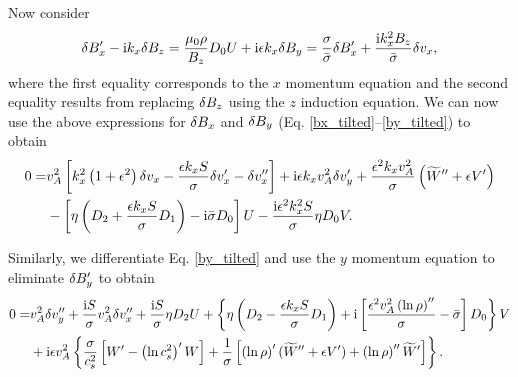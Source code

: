 Now consider
\begin{align}
  \delta B_x^\prime - \mathrm{i} k_x \delta B_z = \frac{\mu_0\rho}{B_z}D_0U +
  \mathrm{i}\epsilon k_x \delta B_y = \frac{\sigma}{\bar{\sigma}}\delta B_x^\prime +
  \frac{\mathrm{i} k_x^2B_z}{\bar{\sigma}}\delta v_x,
\end{align}
where the first equality corresponds to the $x$ momentum equation and
the second equality results from replacing $\delta B_z$ using the $z$
induction equation. We can now use the above expressions for $\delta B_x$
and $\delta B_y$ (Eq. \ref{bx_tilted}--\ref{by_tilted}) to obtain
\begin{align}
0 = &v_A^2\left[k_x^2\left(1+\epsilon^2\right)\dvx - \frac{\epsilon k_x
  S}{\sigma}\dvx^\prime - \dvx^{\prime\prime}\right] + \imgi\epsilon
k_x v_A^2 \dvy^\prime + \frac{\epsilon^2 k_x
  v_A^2}{\sigma}\left(\w^{\prime\prime} + \epsilon V^\prime\right) 
\notag\\ &-\left[\eta\left(D_2 + \frac{\epsilon k_x S}{\sigma}D_1\right) -
  \imgi\sbar D_0 \right]U %
- \frac{\imgi\epsilon^2k_x^2S}{\sigma}\eta D_0V.
\end{align}

Similarly, we differentiate Eq. \ref{by_tilted} and use the $y$
momentum equation to eliminate $\delta B_y^\prime$ to obtain
\begin{align}
0 = &v_A^2\delta v_y^{\prime\prime} + \frac{\mathrm{i} S}{\sigma}v_A^2
\delta v_x^{\prime\prime} +\frac{\mathrm{i} S}{\sigma}\eta D_2U +
\left\{\eta\left(D_2 - \frac{\epsilon k_x S}{\sigma} D_1\right) +
  \mathrm{i}\left[\frac{\epsilon^2v_A^2\left(\ln{\rho}\right)^{\prime\prime}}{\sigma}
    - \bar{\sigma}\right]D_0\right\}V \notag\\ &+ \mathrm{i}\epsilon
  v_A^2\left\{\frac{\sigma}{c_s^2}\left[W^\prime -
    \left(\ln{c_s^2}\right)^\prime W\right] +
    \frac{1}{\sigma}\left[\left(\ln{\rho}\right)^\prime(\widetilde{W}^{\prime\prime}
      + \epsilon V^\prime)
      +\left(\ln{\rho}\right)^{\prime\prime}\widetilde{W}^{\prime} \right]\right\}.    
\end{align}

